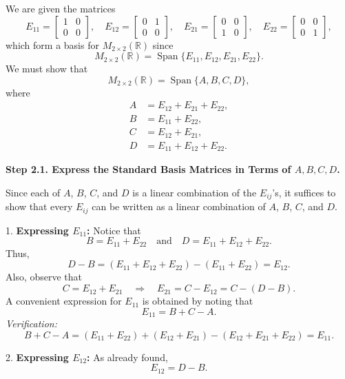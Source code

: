 \documentclass[12pt]{article}
\begin{document}
We are given the matrices
\[
E_{11} = \begin{bmatrix} 1 & 0 \\ 0 & 0 \end{bmatrix},\quad
E_{12} = \begin{bmatrix} 0 & 1 \\ 0 & 0 \end{bmatrix},\quad
E_{21} = \begin{bmatrix} 0 & 0 \\ 1 & 0 \end{bmatrix},\quad
E_{22} = \begin{bmatrix} 0 & 0 \\ 0 & 1 \end{bmatrix},
\]
which form a basis for \(M_{2\times 2}(\mathbb{R})\) since
\[
M_{2\times 2}(\mathbb{R}) = \operatorname{Span}\{E_{11},E_{12},E_{21},E_{22}\}.
\]
We must show that
\[
M_{2\times 2}(\mathbb{R}) = \operatorname{Span}\{A,B,C,D\},
\]
where
\[
\begin{aligned}
A &= E_{12} + E_{21} + E_{22},\\[1mm]
B &= E_{11} + E_{22},\\[1mm]
C &= E_{12} + E_{21},\\[1mm]
D &= E_{11} + E_{12} + E_{22}.
\end{aligned}
\]

\medskip

\textbf{Step 2.1. Express the Standard Basis Matrices in Terms of \(A, B, C, D\).}

Since each of \(A\), \(B\), \(C\), and \(D\) is a linear combination of the \(E_{ij}\)'s, it suffices to show that every \(E_{ij}\) can be written as a linear combination of \(A\), \(B\), \(C\), and \(D\).

\medskip

1. \textbf{Expressing \(E_{11}\):}  
Notice that
\[
B = E_{11} + E_{22} \quad \text{and} \quad D = E_{11} + E_{12} + E_{22}.
\]
Thus,
\[
D - B = (E_{11}+E_{12}+E_{22}) - (E_{11}+E_{22}) = E_{12}.
\]
Also, observe that
\[
C = E_{12} + E_{21} \quad \Longrightarrow \quad E_{21} = C - E_{12} = C - (D-B).
\]
A convenient expression for \(E_{11}\) is obtained by noting that
\[
E_{11} = B + C - A.
\]
\emph{Verification:}
\[
B+C-A = (E_{11}+E_{22}) + (E_{12}+E_{21}) - (E_{12}+E_{21}+E_{22}) = E_{11}.
\]

\medskip

2. \textbf{Expressing \(E_{12}\):}  
As already found,
\[
E_{12} = D - B.
\]

\medskip
\end{document}
